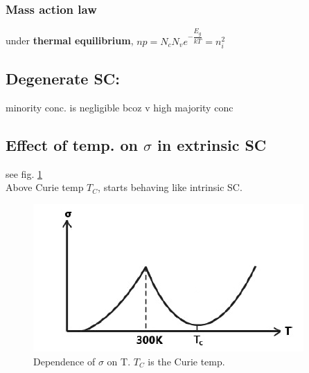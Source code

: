 \documentclass[10pt, a4paper]{report}
\begin{document}
	\subsubsection{Mass action law}
	under \textbf{thermal equilibrium}, $ np = N_cN_v e^{-\dfrac{E_g}{kT}} = n_i^2 $
	\subsection{Degenerate SC:} minority conc. is negligible bcoz v high majority conc\\
	
	\subsection{Effect of temp. on $ \sigma $ in extrinsic SC}
	see fig. \ref{fig:effect-of-temp}\\
	Above Curie temp $ T_C $, starts behaving like intrinsic SC.
	\begin{figure}[h]
		\centering
		\includegraphics[width=0.7\linewidth]{img/effect-of-temp}
		\caption{Dependence of $ \sigma $ on T. $ T_C $ is the Curie temp.}
		\label{fig:effect-of-temp}
	\end{figure}
	
\end{document}
